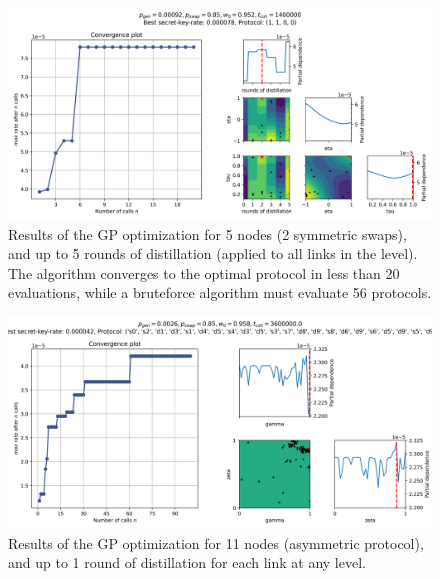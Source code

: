 \documentclass{article}
\begin{document}
\begin{figure}[ht!]
  \centering
  \includegraphics[width=\linewidth, trim = 10 10 10 50, clip]{symmetric/results_gp_centerspace/skopt_gp.png}
  \caption{Results of the GP optimization for 5 nodes (2 symmetric swaps), and up to 5 rounds of distillation (applied to all links in the level). The algorithm converges to the optimal protocol in less than 20 evaluations, while a bruteforce algorithm must evaluate 56 protocols.}
  \label{fig:symmetric_5_nodes}
\end{figure}

\begin{figure}[ht!]
  \centering
  \includegraphics[width=\linewidth, trim = 10 10 10 50, clip]{asymmetric/gp11,1/skopt_gp.png}
  \caption{Results of the GP optimization for 11 nodes (asymmetric protocol), and up to 1 round of distillation for each link at any level.}
  \label{fig:asymmetric_11_nodes}
\end{figure}
\end{document}
